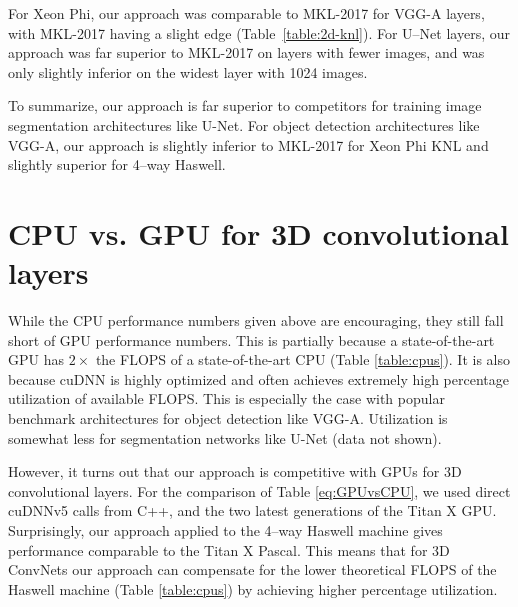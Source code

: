   For Xeon Phi, our approach was comparable to MKL-2017 for VGG-A
  layers, with MKL-2017 having a slight edge
  (Table~\ref{table:2d-knl}).  For U--Net layers, our approach was far
  superior to MKL-2017 on layers with fewer images, and was only
  slightly inferior on the widest layer with 1024 images.

  To summarize, our approach is far superior to competitors for
  training image segmentation architectures like U-Net.  For object
  detection architectures like VGG-A, our approach is slightly
  inferior to MKL-2017 for Xeon Phi KNL and slightly superior for
  4--way Haswell.

  \section{CPU vs. GPU for 3D convolutional layers}
  While the CPU performance numbers given above are encouraging, they
  still fall short of GPU performance numbers.  This is partially
  because a state-of-the-art GPU has $2\times$ the FLOPS of a
  state-of-the-art CPU (Table \ref{table:cpus}).  It is also because
  cuDNN is highly optimized and often achieves extremely high
  percentage utilization of available FLOPS.  This is especially the
  case with popular benchmark architectures for object detection like
  VGG-A.  Utilization is somewhat less for segmentation networks like
  U-Net (data not shown).

  However, it turns out that our approach is competitive with GPUs for
  3D convolutional layers.  For the comparison of Table
  \ref{eq:GPUvsCPU}, we used direct cuDNNv5 calls from C++, and the
  two latest generations of the Titan X GPU.  Surprisingly, our
  approach applied to the 4--way Haswell machine gives performance
  comparable to the Titan X Pascal.  This means that for 3D ConvNets
  our approach can compensate for the lower theoretical FLOPS of the
  Haswell machine (Table \ref{table:cpus}) by achieving higher
  percentage utilization.


